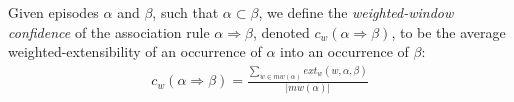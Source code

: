 \begin{definition}
Given episodes $ \alpha $ and $ \beta $, such that $ \alpha \subset \beta $, we define the \emph{weighted-window confidence} of the association rule $ \alpha \Rightarrow \beta $, denoted $ c_w(\alpha \Rightarrow \beta) $, to be the average weighted-extensibility of an occurrence of $ \alpha $ into an occurrence of $ \beta $:
\begin{align*}
c_w(\alpha \Rightarrow \beta) = \frac{\sum_{w \in mw(\alpha)} ext_w(w, \alpha, \beta)}{| mw(\alpha) |}
\end{align*}
\end{definition}

